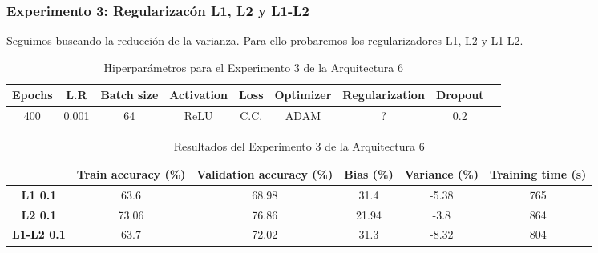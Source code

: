 \documentclass{article}
\begin{document}
        \subsubsection{Experimento 3: Regularizac\'on L1, L2 y L1-L2 }
        Seguimos buscando la reducci\'on de la varianza. Para ello probaremos los regularizadores L1, L2 y L1-L2. 


      
        \begin{table}[!h]
				\begin{tabular}{|c|c|c|c|c|c|c|c|c|}
					\textbf{Epochs}&\textbf{L.R}&\textbf{Batch size}&\textbf{Activation}&\textbf{Loss}&\textbf{Optimizer}&\textbf{Regularization}&\textbf{Dropout}   \\ \hline
					400 & 0.001 & 64 & ReLU & C.C. & ADAM & ? & 0.2 
				\end{tabular}
				\caption{Hiperpar\'ametros para el Experimento 3 de la Arquitectura 6}
				\label{tab:hip-a6-e2}
			\end{table}

    
   
   \begin{table}[!h]
				\begin{center}
					\begin{tabular}{ c | c | c | c | c | c |}
						\ & \textbf{Train accuracy (\%)} & \textbf{Validation accuracy (\%)} & \textbf{Bias (\%)} & \textbf{Variance (\%)} & \textbf{Training time (s)} \\ \hline
						\textbf{L1 0.1} &63.6   &68.98  & 31.4  & -5.38 &  765 \\ \hline
						\textbf{L2 0.1} & 73.06   & 76.86 &  21.94 & -3.8 &864   \\ \hline
                        \textbf{L1-L2 0.1} &  63.7  &72.02 &  31.3 & -8.32 &804   \\ \hline
					\end{tabular}
					\caption{Resultados del Experimento 3 de la Arquitectura 6}
					\label{tab:res-a2-e5}
				\end{center}
			\end{table}
   
\end{document}
